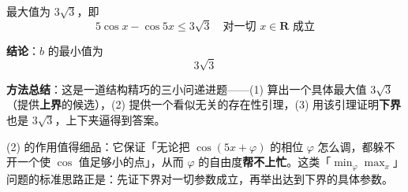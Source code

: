 最大值为 $3\sqrt3$，即
\[5\cos x-\cos5x\le3\sqrt3\quad\text{对一切 }x\in\mathbf R\text{ 成立}\]

\textbf{结论}：$b$ 的最小值为
\[\boxed{3\sqrt3}\]

\begin{gktip}
\textbf{方法总结}：这是一道结构精巧的三小问递进题——(1) 算出一个具体最大值 $3\sqrt3$（提供\textbf{上界}的候选），(2) 提供一个看似无关的存在性引理，(3) 用该引理证明\textbf{下界}也是 $3\sqrt3$，上下夹逼得到答案。

(2) 的作用值得细品：它保证「无论把 $\cos(5x+\varphi)$ 的相位 $\varphi$ 怎么调，都躲不开一个使 $\cos$ 值足够小的点」，从而 $\varphi$ 的自由度\textbf{帮不上忙}。这类「$\min_\varphi\max_x$」问题的标准思路正是：先证下界对一切参数成立，再举出达到下界的具体参数。
\end{gktip}

